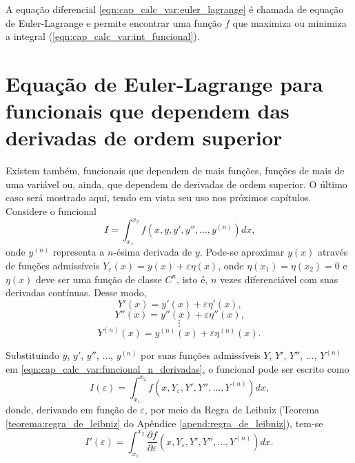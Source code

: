 \documentclass[
	12pt,				%
	openright,			%
    twoside,			%
	a4paper,			%
	english,			%
	french,				%
	spanish,			%
	brazil				%
	]{abntex2}
\numberwithin{lema}{chapter}
\numberwithin{teorema}{chapter}
\numberwithin{definicao}{chapter}
\numberwithin{exemplo}{chapter}
\numberwithin{figure}{chapter}
\begin{document}
A equação diferencial \eqref{eqn:cap_calc_var:euler_lagrange} é chamada de equação de Euler-Lagrange e permite encontrar uma função $f$ que maximiza ou minimiza a integral (\ref{eqn:cap_calc_var:int_funcional}).

\section{Equação de Euler-Lagrange para funcionais que dependem das derivadas de ordem superior}
\label{sec:eq_euler_lagrange_superior}

Existem também, funcionais que dependem de mais funções, funções de mais de uma variável ou, ainda, que dependem de derivadas de ordem superior. O último caso será mostrado aqui, tendo em vista seu uso nos próximos capítulos. Considere o funcional
\begin{equation}
	\label{eqn:cap_calc_var:funcional_n_derivadas}
	I=\int_{x_1}^{x_2} f(x, y, y', y'', \dots, y^{(n)})dx
	\text{,}
\end{equation}
onde $y^{(n)}$ representa a $n$-ésima derivada de $y$. Pode-se aproximar $y(x)$ através de funções admissíveis $Y_{\varepsilon}(x)=y(x)+\varepsilon \eta (x)$, onde $\eta(x_1)=\eta(x_2)=0$ e $\eta(x)$ deve ser uma função de classe $C^n$, isto é, $n$ vezes diferenciável com suas derivadas contínuas. Desse modo,
$$
	Y'(x)=y'(x)+\varepsilon \eta ' (x)
	\text{,}
$$
$$
	Y''(x)=y''(x)+\varepsilon \eta '' (x)
	\text{,}
$$
$$
	\vdots
$$
$$
	Y^{(n)} (x)= y^{(n)}(x)+\varepsilon \eta^{(n)} (x)
	\text{.}
$$

Substituindo $y$, $y'$, $y''$, $\dots$, $y^{(n)}$ por suas funções admissíveis $Y$, $Y'$, $Y''$, $\dots$, $Y^{(n)}$ em \eqref{eqn:cap_calc_var:funcional_n_derivadas}, o funcional pode ser escrito como
$$
	I(\varepsilon) = \int_{x_1}^{x_2}
		f(x, Y_{\varepsilon}, Y', Y'', \dots, Y^{(n)})
		dx
	\text{,}
$$
donde, derivando em função de $\varepsilon$, por meio da Regra de Leibniz (Teorema \ref{teorema:regra_de_leibniz} do Apêndice \ref{apend:regra_de_leibniz}), tem-se
\begin{equation}
	\label{eqn:cap_calc_var:diff_func_n_derivadas_leibniz}
	I'(\varepsilon) = 
	\int_{x_1}^{x_2}
		\frac{\partial f}{\partial \varepsilon}
		(x, Y_{\varepsilon}, Y', Y'', \dots, Y^{(n)})
		dx
	\text{.}
\end{equation}
\end{document}
